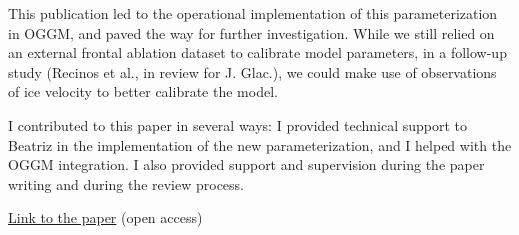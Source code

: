 This publication led to the operational implementation of this parameterization in OGGM, and paved the way for further
investigation. While we still relied on an external frontal ablation dataset to calibrate model parameters, in a
follow-up study (Recinos et al., in review for J. Glac.), we could make use of observations of ice velocity to better
calibrate the model.

I contributed to this paper in several ways: I provided technical support to Beatriz in the implementation of the new
parameterization, and I helped with the OGGM integration. I also provided support and supervision during the paper
writing and during the review process.

\href{https://doi.org/10.5194/tc-13-2657-2019}{Link to the paper} (open access)


%

